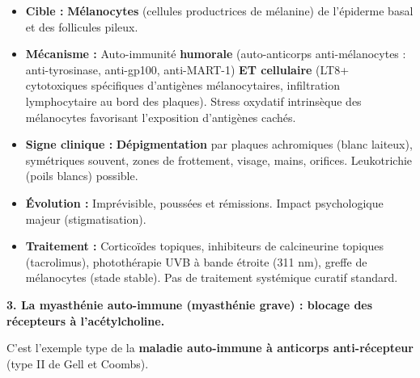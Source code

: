 \documentclass[11pt]{article}
\begin{document}
\begin{propriete}[Vitiligo]
\begin{itemize}
    \item \textbf{Cible :} \textbf{Mélanocytes} (cellules productrices de mélanine) de l'épiderme basal et des follicules pileux.
    \item \textbf{Mécanisme :} Auto-immunité \textbf{humorale} (auto-anticorps anti-mélanocytes : anti-tyrosinase, anti-gp100, anti-MART-1) \textbf{ET cellulaire} (LT8+ cytotoxiques spécifiques d'antigènes mélanocytaires, infiltration lymphocytaire au bord des plaques). Stress oxydatif intrinsèque des mélanocytes favorisant l'exposition d'antigènes cachés.
    \item \textbf{Signe clinique :} \textbf{Dépigmentation} par plaques achromiques (blanc laiteux), symétriques souvent, zones de frottement, visage, mains, orifices. Leukotrichie (poils blancs) possible.
    \item \textbf{Évolution :} Imprévisible, poussées et rémissions. Impact psychologique majeur (stigmatisation).
    \item \textbf{Traitement :} Corticoïdes topiques, inhibiteurs de calcineurine topiques (tacrolimus), photothérapie UVB à bande étroite (311 nm), greffe de mélanocytes (stade stable). Pas de traitement systémique curatif standard.
\end{itemize}
\end{propriete}

\textbf{3. La myasthénie auto-immune (myasthénie grave) : blocage des récepteurs à l'acétylcholine.}

C'est l'exemple type de la \textbf{maladie auto-immune à anticorps anti-récepteur} (type II de Gell et Coombs).
\end{document}
